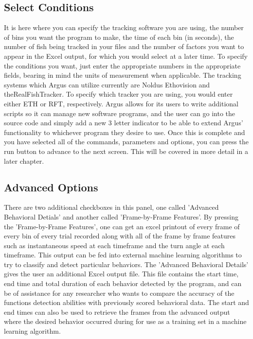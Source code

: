 \documentclass[12pt,titlepage]{report}
\begin{document}
\subsection{Select Conditions}
It is here where you can specify the tracking software you are using, the number of bins you want the program to make, the time of each bin (in seconds), the number of fish being tracked in your files and the number of factors you want to appear in the Excel output, for which you would select at a later time. To specify the conditions you want, just enter the appropriate numbers in the appropriate fields, bearing in mind the units of measurement when applicable. The tracking systems which Argus can utilize currently are Noldus Ethovision and theRealFishTracker. To specify which tracker you are using, you would enter either ETH or RFT, respectively. Argus allows for its users to write additional scripts so it can manage new software programs, and the user can go into the source code and simply add a new 3 letter indicator to be able to extend Argus' functionality to whichever program they desire to use. Once this is complete and you have selected all of the commands, parameters and options, you can press the run button to advance to the next screen. This will be covered in more detail in a later chapter. 
\subsection{Advanced Options}
There are two additional checkboxes in this panel, one called 'Advanced Behavioral Detials' and another called 'Frame-by-Frame Features'. By pressing the 'Frame-by-Frame Features', one can get an excel printout of every frame of every bin of every trial recorded along with all of the frame by frame features such as instantaneous speed at each timeframe and the turn angle at each timeframe. This output can be fed into external machine learning algorithms to try to classify and detect particular behaviors.
The 'Advanced Behavioral Details' gives the user an additional Excel output file. This file contains the start time, end time and total duration of each behavior detected by the program, and can be of assistance for any researcher who wants to compare the accuracy of the functions detection abilities with previously scored behavioral data. The start and end times can also be used to retrieve the frames from the advanced output where the desired behavior occurred during for use as a training set in a machine learning algorithm.
\end{document}
